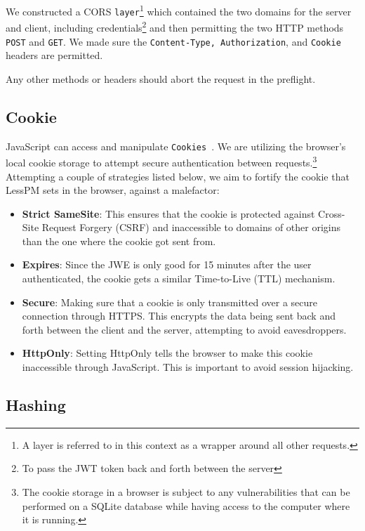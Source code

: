 We constructed a CORS \texttt{layer}\footnote{
  A layer is referred to in this context as a wrapper around all other requests.
} which contained the two domains for the server and client, including
credentials\footnote{
  To pass the JWT token back and forth between the server
} and then permitting the two HTTP methods \texttt{POST} and \texttt{GET}.
We made sure the \texttt{Content-Type, Authorization}, and \texttt{Cookie}
headers are permitted.

Any other methods or headers should abort the request in the preflight.

\subsection{Cookie}\label{subsec:cookie}
JavaScript can access and manipulate \texttt{Cookies}~\cite{he2019malicious}.
We are utilizing the browser's local cookie storage to attempt secure
authentication between requests.\footnote{
  The cookie storage in a browser is subject to any vulnerabilities that can
  be performed on a SQLite database while having access to the computer where
  it is running.
}
Attempting a couple of strategies listed below, we aim to fortify the cookie
that LessPM sets in the browser, against a malefactor:
\begin{itemize}
  \item \textbf{Strict SameSite}:
  This ensures that the cookie is protected against Cross-Site Request
  Forgery (CSRF) and inaccessible to domains of other origins than the one
  where the cookie got sent from.
  \item \textbf{Expires}:
  Since the JWE is only good for 15 minutes after the user authenticated, the
  cookie gets a similar Time-to-Live (TTL) mechanism.
  \item \textbf{Secure}:
  Making sure that a cookie is only transmitted over a secure connection
  through HTTPS\@.
  This encrypts the data being sent back and forth between the client and
  the server, attempting to avoid eavesdroppers.
  \item \textbf{HttpOnly}:
  Setting HttpOnly tells the browser to make this cookie inaccessible through
  JavaScript.
  This is important to avoid session hijacking.
\end{itemize}


\subsection{Hashing}\label{subsec:hashing}

